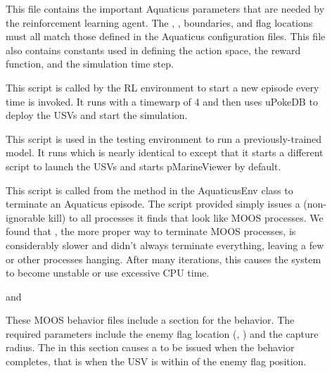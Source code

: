 \documentclass[onecolumn,letterpaper,11pt]{article}
\begin{document}
\begin{description}
\item []
  This file contains the important Aquaticus parameters that are
  needed by the reinforcement learning agent. The ,
  , boundaries, and flag locations must all match
  those defined in the Aquaticus configuration files. This file also
  contains constants used in defining the action space, the reward
  function, and the simulation time step.

\item []
  This script is called by the RL environment to start a new episode every
  time  is invoked. It runs  with a timewarp
  of 4 and then uses uPokeDB to deploy the USVs and start the simulation.

\item []
  This script is used in the testing environment to run a
  previously-trained model. It runs  which is nearly
  identical to  except that it starts a different
  script to launch the USVs and starts pMarineViewer by default.

\item []
  This script is called from the  method in the
  AquaticusEnv class to terminate an Aquaticus episode. The script
  provided simply issues a  (non-ignorable kill) to all
  processes it finds that look like MOOS processes. We found that
  , the more proper way to terminate MOOS processes, is
  considerably slower and didn't always terminate everything, leaving
  a few  or other processes hanging. After many
  iterations, this causes the system to become unstable or use excessive
  CPU time.
  
\item [] and
\item []
  These MOOS behavior files include a section for the
   behavior. The required parameters include the
  enemy flag location (, ) and the capture
  radius. The  in this section causes a
   to be issued when the behavior completes,
  that is when the USV is within  of the enemy
  flag position.
\end{description}
\end{document}
